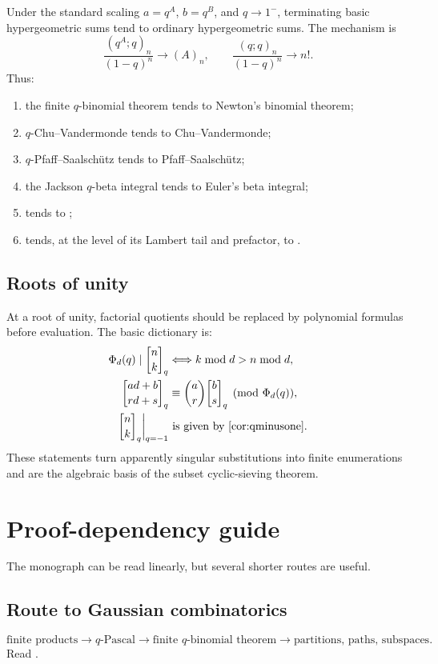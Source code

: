 \documentclass[11pt,oneside,openany]{book}
\theoremstyle{definition}
\theoremstyle{remark}
\newcommand{\qbinom}[2]{\genfrac{[}{]}{0pt}{}{#1}{#2}_{q}}
\newcommand{\Qbinom}[3]{\genfrac{[}{]}{0pt}{}{#1}{#2}_{#3}}
\begin{document}
Under the standard scaling $a=q^A$, $b=q^B$, and $q\to1^-$, terminating basic hypergeometric sums tend to ordinary hypergeometric sums.  The mechanism is
\[
 \frac{(q^A;q)_n}{(1-q)^n}\longrightarrow(A)_n,
 \qquad
 \frac{(q;q)_n}{(1-q)^n}\longrightarrow n!.
\]
Thus:
\begin{enumerate}
\item the finite $q$-binomial theorem tends to Newton's binomial theorem;
\item $q$-Chu--Vandermonde tends to Chu--Vandermonde;
\item $q$-Pfaff--Saalsch\"utz tends to Pfaff--Saalsch\"utz;
\item the Jackson $q$-beta integral tends to Euler's beta integral;
\item {} tends to ;
\item {} tends, at the level of its Lambert tail and prefactor, to .
\end{enumerate}

\section{Roots of unity}

At a root of unity, factorial quotients should be replaced by polynomial formulas before evaluation.  The basic dictionary is:
\begin{align*}
 \Phi_d(q)\mid\qbinom nk
 &\Longleftrightarrow k\bmod d>n\bmod d,\\
 \Qbinom{ad+b}{rd+s}q
 &\equiv\binom ar\Qbinom bsq\pmod{\Phi_d(q)},\\
 \qbinom nk\bigg|_{q=-1}
 &\text{ is given by \Cref{cor:qminusone}.}
\end{align*}
These statements turn apparently singular substitutions into finite enumerations and are the algebraic basis of the subset cyclic-sieving theorem.

\chapter{Proof-dependency guide}\label{app:dependencies}

The monograph can be read linearly, but several shorter routes are useful.

\section*{Route to Gaussian combinatorics}
\[
 \text{finite products}
 \longrightarrow q\text{-Pascal}
 \longrightarrow \text{finite }q\text{-binomial theorem}
 \longrightarrow \text{partitions, paths, subspaces}.
\]
Read .
\end{document}
